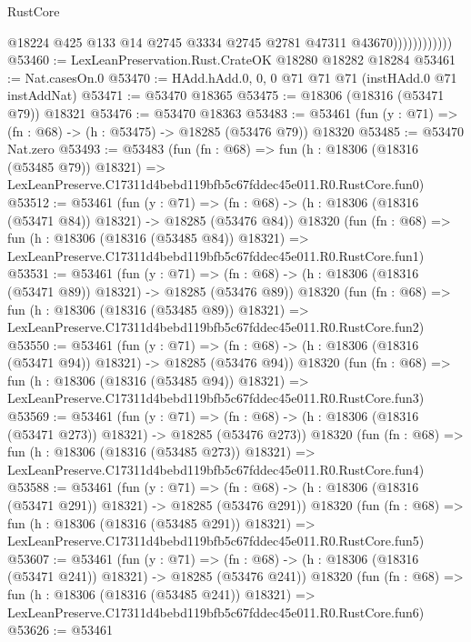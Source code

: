 \begin{lexlean}{RustCore}
\begin{coremodule}
                            @18224
                            @425
                            @133
                            @14
                            @2745
                            @3334
                            @2745
                            @2781
                            @47311
                            @43670))))))))))))
@53460 := LexLeanPreservation.Rust.CrateOK @18280 @18282 @18284
@53461 := Nat.casesOn.{0}
@53470 := HAdd.hAdd.{0, 0, 0} @71 @71 @71 (instHAdd.{0} @71 instAddNat)
@53471 := @53470 @18365
@53475 := @18306 (@18316 (@53471 @79)) @18321
@53476 := @53470 @18363
@53483 := @53461 (fun (y : @71) => (fn : @68) -> (h : @53475) -> @18285 (@53476 @79)) @18320
@53485 := @53470 Nat.zero
@53493 := @53483
    (fun (fn : @68) =>
    fun (h : @18306 (@18316 (@53485 @79)) @18321) =>
    LexLeanPreserve.C17311d4bebd119bfb5c67fddec45e011.R0.RustCore.fun0)
@53512 := @53461
    (fun (y : @71) =>
    (fn : @68) -> (h : @18306 (@18316 (@53471 @84)) @18321) -> @18285 (@53476 @84))
    @18320
    (fun (fn : @68) =>
    fun (h : @18306 (@18316 (@53485 @84)) @18321) =>
    LexLeanPreserve.C17311d4bebd119bfb5c67fddec45e011.R0.RustCore.fun1)
@53531 := @53461
    (fun (y : @71) =>
    (fn : @68) -> (h : @18306 (@18316 (@53471 @89)) @18321) -> @18285 (@53476 @89))
    @18320
    (fun (fn : @68) =>
    fun (h : @18306 (@18316 (@53485 @89)) @18321) =>
    LexLeanPreserve.C17311d4bebd119bfb5c67fddec45e011.R0.RustCore.fun2)
@53550 := @53461
    (fun (y : @71) =>
    (fn : @68) -> (h : @18306 (@18316 (@53471 @94)) @18321) -> @18285 (@53476 @94))
    @18320
    (fun (fn : @68) =>
    fun (h : @18306 (@18316 (@53485 @94)) @18321) =>
    LexLeanPreserve.C17311d4bebd119bfb5c67fddec45e011.R0.RustCore.fun3)
@53569 := @53461
    (fun (y : @71) =>
    (fn : @68) -> (h : @18306 (@18316 (@53471 @273)) @18321) -> @18285 (@53476 @273))
    @18320
    (fun (fn : @68) =>
    fun (h : @18306 (@18316 (@53485 @273)) @18321) =>
    LexLeanPreserve.C17311d4bebd119bfb5c67fddec45e011.R0.RustCore.fun4)
@53588 := @53461
    (fun (y : @71) =>
    (fn : @68) -> (h : @18306 (@18316 (@53471 @291)) @18321) -> @18285 (@53476 @291))
    @18320
    (fun (fn : @68) =>
    fun (h : @18306 (@18316 (@53485 @291)) @18321) =>
    LexLeanPreserve.C17311d4bebd119bfb5c67fddec45e011.R0.RustCore.fun5)
@53607 := @53461
    (fun (y : @71) =>
    (fn : @68) -> (h : @18306 (@18316 (@53471 @241)) @18321) -> @18285 (@53476 @241))
    @18320
    (fun (fn : @68) =>
    fun (h : @18306 (@18316 (@53485 @241)) @18321) =>
    LexLeanPreserve.C17311d4bebd119bfb5c67fddec45e011.R0.RustCore.fun6)
@53626 := @53461

\end{coremodule}
\end{lexlean}
